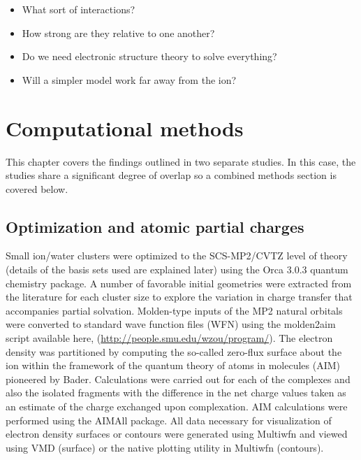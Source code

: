\begin{sie}
  \begin{itemize}
      \item What sort of interactions? 
      \item How strong are they relative to one another?
      \item Do we need electronic structure theory to solve everything?
      \item Will a simpler model work far away from the ion?
  \end{itemize}
  
  \section{\label{ch3:sec1:level1}Computational methods}
  This chapter covers the findings outlined in two separate studies. In this case, the studies share a significant degree of overlap so a 
  combined methods section is covered below.
  
   \subsection{\label{ch3:sec1:level2}Optimization and atomic partial charges}
    Small ion/water clusters were optimized to the SCS-MP2/CVTZ level of theory\cite{grimme2003scsmp2} (details of the basis sets used are 
    explained later) using the Orca 3.0.3 quantum chemistry package\cite{neese2012orca,valeev2014libint}. A number of favorable initial 
    geometries were extracted from the literature for each cluster size to explore the variation in charge transfer that accompanies partial 
    solvation\cite{kim1999bigf,kim2000smallall,kim2002bigall}. Molden-type inputs of the MP2 natural orbitals were converted 
    to standard wave function files (WFN) using the molden2aim script available here, (\url{http://people.smu.edu/wzou/program/}). The electron 
    density was partitioned by computing the so-called zero-flux surface about the ion within the framework of the quantum theory of atoms 
    in molecules (AIM) pioneered by Bader\cite{bader1990book}. Calculations were carried out for each of the complexes and also the isolated 
    fragments with the difference in the net charge values taken as an estimate of the charge exchanged upon complexation. AIM calculations 
    were performed using the AIMAll package\cite{bader1982proaim,keith2012aimall}. All data necessary for visualization of electron 
    density surfaces or contours were generated using Multiwfn\cite{lu2012multiwfn} and viewed using VMD\cite{humphrey1996vmd} (surface) or the 
    native plotting utility in Multiwfn (contours).


\end{sie}
